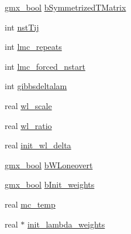 \begin{DoxyCompactItemize}
\item 
\hyperlink{include_2types_2simple_8h_a8fddad319f226e856400d190198d5151}{gmx\-\_\-bool} \hyperlink{structt__expanded_ad9b023b5789ad52da38a8b424175e87b}{b\-Symmetrized\-T\-Matrix}
\item 
int \hyperlink{structt__expanded_a2f22b7b889fc0d16c8b15b046bc32653}{nst\-Tij}
\item 
int \hyperlink{structt__expanded_aa0c4511d86c0f647c838a9ede611d00d}{lmc\-\_\-repeats}
\item 
int \hyperlink{structt__expanded_af68a0a2992805726839b85c11fa724ae}{lmc\-\_\-forced\-\_\-nstart}
\item 
int \hyperlink{structt__expanded_a5b69389ed4db87476654e381a13259b4}{gibbsdeltalam}
\item 
real \hyperlink{structt__expanded_ad1b06c01d335129ce124cf98953a1ce4}{wl\-\_\-scale}
\item 
real \hyperlink{structt__expanded_a0a7171e59c528109957d5761c107e85c}{wl\-\_\-ratio}
\item 
real \hyperlink{structt__expanded_a069a207fdf0cbe5cf40e7fa4ddf3a779}{init\-\_\-wl\-\_\-delta}
\item 
\hyperlink{include_2types_2simple_8h_a8fddad319f226e856400d190198d5151}{gmx\-\_\-bool} \hyperlink{structt__expanded_ad17a3e97f6c5d08f44c81eb7473aa801}{b\-W\-Loneovert}
\item 
\hyperlink{include_2types_2simple_8h_a8fddad319f226e856400d190198d5151}{gmx\-\_\-bool} \hyperlink{structt__expanded_a33682652386e4204d28051261d1ad024}{b\-Init\-\_\-weights}
\item 
real \hyperlink{structt__expanded_a195df3e87b63befb20b61f21b665b1b2}{mc\-\_\-temp}
\item 
real $\ast$ \hyperlink{structt__expanded_ad77ef733c8f0f5c643430d2769df4f45}{init\-\_\-lambda\-\_\-weights}
\end{DoxyCompactItemize}


